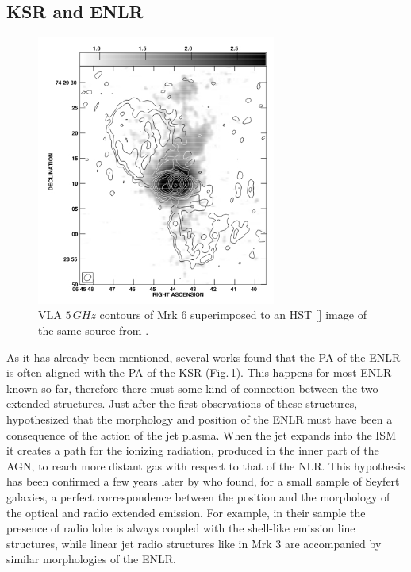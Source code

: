 \documentclass[../main.tex]{subfiles}
\begin{document}
\subsection{KSR and ENLR}

\begin{figure}
\centering
\includegraphics[width=0.7\textwidth]{PhD_thesis/images/Mrk6_kharb.jpg} 
\caption[]{VLA $5\,\si{GHz}$ contours of Mrk 6 superimposed to an HST [] image of the same source from \citet{Kharb06}. }
\label{fig:mrk6_kharb}
\end{figure}

As it has already been mentioned, several works found that the PA of the ENLR is often aligned with the PA of the KSR \citep[e.g.][]{Unger87,Wilson94,Capetti96,Falcke98,Schmitt03,Schmitt03b,Morganti07,Husemann13} (Fig.\,\ref{fig:mrk6_kharb}). 
This happens for most ENLR known so far, therefore there must some kind of connection between the two extended structures.
Just after the first observations of these structures, \citet{Wilson94} hypothesized that the morphology and position of the ENLR must have been a consequence of the action of the jet plasma.
When the jet expands into the ISM it creates a path for the ionizing radiation, produced in the inner part of the AGN, to reach more distant gas with respect to that of the NLR.
This hypothesis has been confirmed a few years later by \citet{Capetti96} who found, for a small sample of Seyfert galaxies, a perfect correspondence between the position and the morphology of the optical and radio extended emission.
For example, in their sample the presence of radio lobe is always coupled with the shell-like emission line structures, while linear jet radio structures like in Mrk 3 are accompanied by similar morphologies of the ENLR.
\end{document}
